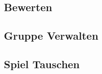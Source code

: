 \vfill

\subsection*{Bewerten}
\begin{figure}[h!]
	\centering
	\label{fig:ActDia_Bewerten}
\end{figure}

\vfill
\pagebreak
\vfill

\subsection*{Gruppe Verwalten}
\begin{figure}[h!]
	\centering
	\label{fig:ActDia_Gruppe_Verwalten}
\end{figure}

\vfill

\subsection*{Spiel Tauschen}
\begin{figure}[h!]
	\centering
	\label{fig:ActDia_Spiel_Tauschen}
\end{figure}
